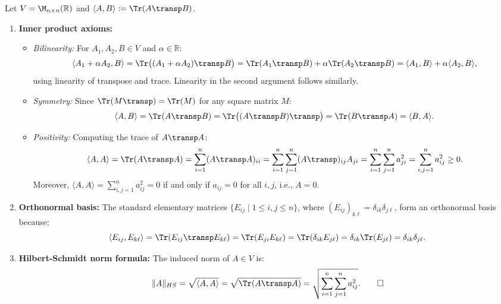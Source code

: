 \begin{exercisesolution}
\label{sol:frobenius_hilbert_schmidt_inner_product}
Let $V = \M_{n \times n}(\mathbb{R})$ and $\langle A, B \rangle := \Tr(A\transp B)$.
\begin{enumerate}[label=\textbf{(\alph*)}]
    \item \textbf{Inner product axioms:}
    \begin{itemize}
        \item \emph{Bilinearity:} For $A_1, A_2, B \in V$ and $\alpha \in \mathbb{R}$:
        \[
        \langle A_1 + \alpha A_2, B \rangle = \Tr\big((A_1 + \alpha A_2)\transp B\big) = \Tr(A_1\transp B) + \alpha \Tr(A_2\transp B) = \langle A_1, B \rangle + \alpha \langle A_2, B \rangle,
        \]
        using linearity of transpose and trace. Linearity in the second argument follows similarly.
        \item \emph{Symmetry:} Since $\Tr(M\transp) = \Tr(M)$ for any square matrix $M$:
        \[
        \langle A, B \rangle = \Tr(A\transp B) = \Tr\big((A\transp B)\transp\big) = \Tr(B\transp A) = \langle B, A \rangle.
        \]
        \item \emph{Positivity:} Computing the trace of $A\transp A$:
        \[
        \langle A, A \rangle = \Tr(A\transp A) = \sum_{i=1}^n (A\transp A)_{ii} = \sum_{i=1}^n \sum_{j=1}^n (A\transp)_{ij} A_{ji} = \sum_{i=1}^n \sum_{j=1}^n a_{ji}^2 = \sum_{i,j=1}^n a_{ij}^2 \ge 0.
        \]
        Moreover, $\langle A, A \rangle = \sum_{i,j=1}^n a_{ij}^2 = 0$ if and only if $a_{ij} = 0$ for all $i,j$, i.e., $A = 0$.
    \end{itemize}

    \item \textbf{Orthonormal basis:}
    The standard elementary matrices $\{E_{ij} \mid 1 \le i, j \le n\}$, where $(E_{ij})_{k\ell} = \delta_{ik}\delta_{j\ell}$, form an orthonormal basis because:
    \[
    \langle E_{ij}, E_{k\ell} \rangle = \Tr(E_{ij}\transp E_{k\ell}) = \Tr(E_{ji} E_{k\ell}) = \Tr(\delta_{ik} E_{j\ell}) = \delta_{ik} \Tr(E_{j\ell}) = \delta_{ik} \delta_{j\ell}.
    \]

    \item \textbf{Hilbert-Schmidt norm formula:}
    The induced norm of $A \in V$ is:
    \[
    \|A\|_{HS} = \sqrt{\langle A, A \rangle} = \sqrt{\Tr(A\transp A)} = \sqrt{\sum_{i=1}^n \sum_{j=1}^n a_{ij}^2}. \qedhere
    \]
\end{enumerate}
\end{exercisesolution}

